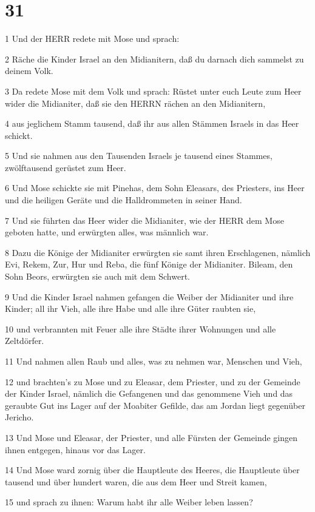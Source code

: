 \chapter{31}

\par 1 Und der HERR redete mit Mose und sprach:
\par 2 Räche die Kinder Israel an den Midianitern, daß du darnach dich sammelst zu deinem Volk.
\par 3 Da redete Mose mit dem Volk und sprach: Rüstet unter euch Leute zum Heer wider die Midianiter, daß sie den HERRN rächen an den Midianitern,
\par 4 aus jeglichem Stamm tausend, daß ihr aus allen Stämmen Israels in das Heer schickt.
\par 5 Und sie nahmen aus den Tausenden Israels je tausend eines Stammes, zwölftausend gerüstet zum Heer.
\par 6 Und Mose schickte sie mit Pinehas, dem Sohn Eleasars, des Priesters, ins Heer und die heiligen Geräte und die Halldrommeten in seiner Hand.
\par 7 Und sie führten das Heer wider die Midianiter, wie der HERR dem Mose geboten hatte, und erwürgten alles, was männlich war.
\par 8 Dazu die Könige der Midianiter erwürgten sie samt ihren Erschlagenen, nämlich Evi, Rekem, Zur, Hur und Reba, die fünf Könige der Midianiter. Bileam, den Sohn Beors, erwürgten sie auch mit dem Schwert.
\par 9 Und die Kinder Israel nahmen gefangen die Weiber der Midianiter und ihre Kinder; all ihr Vieh, alle ihre Habe und alle ihre Güter raubten sie,
\par 10 und verbrannten mit Feuer alle ihre Städte ihrer Wohnungen und alle Zeltdörfer.
\par 11 Und nahmen allen Raub und alles, was zu nehmen war, Menschen und Vieh,
\par 12 und brachten's zu Mose und zu Eleasar, dem Priester, und zu der Gemeinde der Kinder Israel, nämlich die Gefangenen und das genommene Vieh und das geraubte Gut ins Lager auf der Moabiter Gefilde, das am Jordan liegt gegenüber Jericho.
\par 13 Und Mose und Eleasar, der Priester, und alle Fürsten der Gemeinde gingen ihnen entgegen, hinaus vor das Lager.
\par 14 Und Mose ward zornig über die Hauptleute des Heeres, die Hauptleute über tausend und über hundert waren, die aus dem Heer und Streit kamen,
\par 15 und sprach zu ihnen: Warum habt ihr alle Weiber leben lassen?
